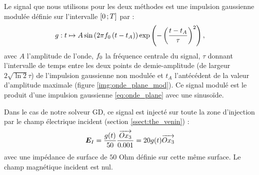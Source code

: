 Le signal que nous utilisons pour les deux méthodes
est une impulsion gaussienne modulée
définie sur l'intervalle $\lbrack0\,;T\rbrack$ par :
\begin{align} \label{eq:onde_plane_mod}
	g : t \mapsto A \sin \left( 2 \pi f_0 \left( t - t_A \right) \right) \exp \left( -\left( \frac{t - t_A}{\tau} \right)^2 \right) ,
\end{align}
avec $A$ l'amplitude de l'onde,
$f_0$ la fréquence centrale du signal,
$\tau$ donnant l'intervalle de temps entre les deux points de demie-amplitude
(de largeur $2 \sqrt{\ln 2} \tau$) de l'impulsion gaussienne non modulée
et $t_A$ l'antécédent de la valeur d'amplitude maximale
(figure \ref{img:onde_plane_mod}).
Ce signal modulé est le produit d'une impulsion gaussienne
\eqref{eq:onde_plane} avec une sinusoïde.

Dans le cas de notre solveur GD, ce signal est injecté
sur toute la zone d'injection par le champ électrique incident
(section \ref{ssect:the_venin}) :
\begin{align}
	\bm{E}_I = \frac{g(t)}{50} \frac{\overrightarrow{Ox_3}}{0.001}
	= 20 g(t) \overrightarrow{Ox_3}
\end{align}
avec une impédance de surface de $50$ Ohm définie sur
cette même surface.
Le champ magnétique incident est nul.


